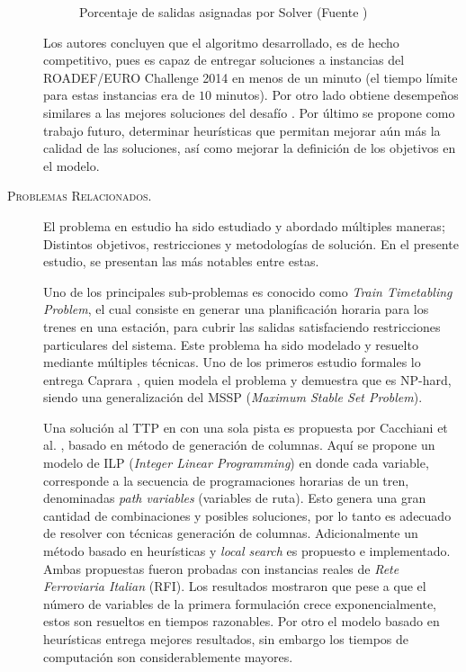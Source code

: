 \documentclass[letter, 10pt]{article}
\begin{document}
\begin{description}
\begin{figure}[htpb!]
    \caption{Porcentaje de salidas asignadas por Solver (Fuente \cite{Mulders})}
    \label{fig:graphres}
    \end{figure}
    Los autores concluyen que el algoritmo desarrollado, es de hecho competitivo, pues es capaz de entregar soluciones a instancias del ROADEF/EURO Challenge 2014 en menos de un minuto (el tiempo límite para estas instancias era de $10$ minutos). Por otro lado obtiene desempeños similares a las mejores soluciones del desafío \cite{RoadefResults}. Por último se propone como trabajo futuro, determinar heurísticas que permitan mejorar aún más la calidad de las soluciones, así como mejorar la definición de los objetivos en el modelo.




    \item[\textsc{Problemas Relacionados.}] El problema en estudio ha sido estudiado y abordado múltiples maneras; Distintos objetivos, restricciones y metodologías de solución. En el presente estudio, se presentan las más notables entre estas.

    Uno de los principales sub-problemas es conocido como \textit{Train Timetabling Problem}, el cual consiste en generar una planificación horaria para los trenes en una estación, para cubrir las salidas satisfaciendo restricciones particulares del sistema. Este problema ha sido modelado y resuelto mediante múltiples técnicas. Uno de los primeros estudio formales lo entrega Caprara \cite{Caprara}, quien modela el problema y demuestra que es NP-hard, siendo una generalización del MSSP (\textit{Maximum Stable Set Problem}).

    Una solución al TTP en con una sola pista es propuesta por Cacchiani et al. \cite{Cacchiani}, basado en método de generación de columnas. Aquí se propone un modelo de ILP (\textit{Integer Linear Programming}) en donde cada variable, corresponde a la secuencia de programaciones horarias de un tren, denominadas \textit{path variables} (variables de ruta). Esto genera una gran cantidad de combinaciones y posibles soluciones, por lo tanto es adecuado de resolver con técnicas generación de columnas. Adicionalmente un método basado en heurísticas y \textit{local search} es propuesto e implementado. Ambas propuestas fueron probadas con instancias reales de \textit{Rete Ferroviaria Italian} (RFI). Los resultados mostraron que pese a que el número de variables de la primera formulación crece exponencialmente, estos son resueltos en tiempos razonables. Por otro el modelo basado en heurísticas entrega mejores resultados, sin embargo los tiempos de computación son considerablemente mayores.


\end{description}
\end{document}
